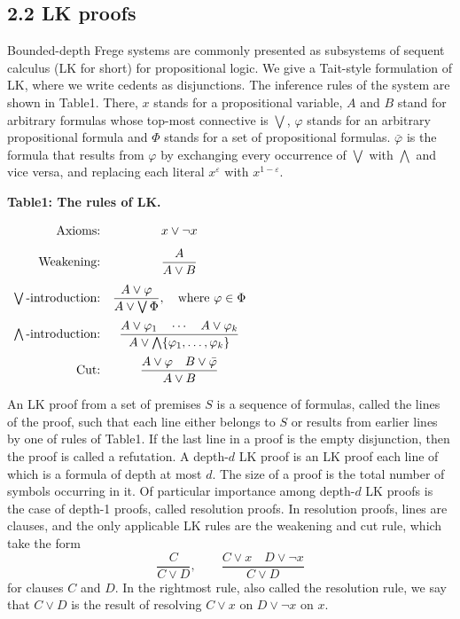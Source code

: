 \subsection*{2.2 LK proofs}
Bounded-depth Frege systems are commonly presented as subsystems of sequent calculus (LK for short) for propositional logic. We give a Tait-style formulation of LK, where we write cedents as disjunctions. The inference rules of the system are shown in Table1. There, $x$ stands for a propositional variable, $A$ and $B$ stand for arbitrary formulas whose top-most connective is $\bigvee$, $\varphi$ stands for an arbitrary propositional formula and $\Phi$ stands for a set of propositional formulas. $\bar\varphi$ is the formula that results from $\varphi$ by exchanging every occurrence of $\bigvee$ with $\bigwedge$ and vice versa, and replacing each literal $x^\varepsilon$ with $x^{1-\varepsilon}$.
\begin{center}\textbf{Table1: The rules of LK.}\par\medskip
$\begin{array}{r@{\quad}c} \text{Axioms:}&x\vee\neg x\\[8pt]\text{Weakening:}&\dfrac{A}{A\vee B}\\[12pt]\bigvee\text{-introduction:}&\dfrac{A\vee\varphi}{A\vee\bigvee\Phi},\quad\text{where }\varphi\in\Phi\\[12pt]\bigwedge\text{-introduction:}&\dfrac{A\vee\varphi_1\quad\cdots\quad A\vee\varphi_k}{A\vee\bigwedge\{\varphi_1,\ldots,\varphi_k\}}\\[12pt]\text{Cut:}&\dfrac{A\vee\varphi\quad B\vee\bar\varphi}{A\vee B}\end{array}$\end{center}
An LK proof from a set of premises $S$ is a sequence of formulas, called the lines of the proof, such that each line either belongs to $S$ or results from earlier lines by one of rules of Table1. If the last line in a proof is the empty disjunction, then the proof is called a refutation. A depth-$d$ LK proof is an LK proof each line of which is a formula of depth at most $d$. The size of a proof is the total number of symbols occurring in it.
Of particular importance among depth-$d$ LK proofs is the case of depth-1 proofs, called resolution proofs. In resolution proofs, lines are clauses, and the only applicable LK rules are the weakening and cut rule, which take the form
\[\frac C{C\vee D},\qquad\frac{C\vee x\quad D\vee\neg x}{C\vee D}\]
for clauses $C$ and $D$. In the rightmost rule, also called the resolution rule, we say that $C\vee D$ is the result of resolving $C\vee x$ on $D\vee\neg x$ on $x$.
